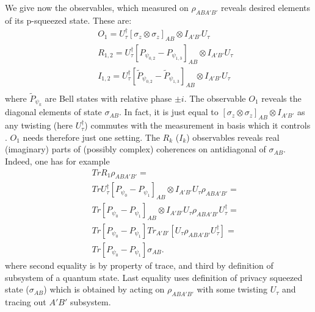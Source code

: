 \documentclass[twocolumn,prl,aps]{revtex4}
\def\ben{\begin{eqnarray}}
\def\een{\end{eqnarray}}
\def\ot{\otimes}
\begin{document}
We give now the observables, which measured on $\rho_{ABA'B'}$ reveals desired 
elements of its p-squeezed state. These are:
\ben
&&O_1 = U_\tau^{\dagger} [\sigma_z \ot \sigma_z]_{AB}\ot I_{A'B'} U_\tau \nonumber\\
&&R_{1,2} = U_\tau^{\dagger} [P_{\psi_{0,2}} - P_{\psi_{1,3}}]_{AB}\ot I_{A'B'} U_\tau \nonumber\\
&&I_{1,2}  = U_\tau^{\dagger} [\tilde{P}_{\psi_{0,2}} - \tilde{P}_{\psi_{1,3}}]_{AB}\ot I_{A'B'} U_\tau \nonumber\\
\een
where $\tilde{P}_{\psi_k}$ are Bell states with relative phase $\pm i$. The observable $O_1$ reveals 
the diagonal elements of state $\sigma_{AB}$. In fact, it is just equal to $[\sigma_z \ot \sigma_z]_{AB}\ot I_{A'B'}$
as any twisting (here $U_\tau^{\dagger}$) commutes with the measurement 
in basis which it controls \cite{keyhuge}. $O_1$ needs therefore
just one setting. The $R_k$ ($I_k$) observables reveals real (imaginary) parts 
of (possibly complex) coherences on antidiagonal of $\sigma_{AB}$. 
Indeed, one has for example
\ben
&&Tr R_1 \rho_{ABA'B'} = \nonumber \\
&&Tr U_\tau^{\dagger} [P_{\psi_0} - P_{\psi_1}]_{AB}\ot I_{A'B'} U_\tau \rho_{ABA'B'}=\nonumber \\
&&Tr  [P_{\psi_0} - P_{\psi_1}]_{AB}\ot I_{A'B'} U_\tau \rho_{ABA'B'}U_\tau^{\dagger}=\nonumber \\
&&Tr  [P_{\psi_0} - P_{\psi_1}] Tr_{A'B'}[U_\tau \rho_{ABA'B'}U_\tau^{\dagger}]=\nonumber \\
&&Tr [P_{\psi_0} - P_{\psi_1}] \sigma_{AB}.
\een
where second equality is by property of trace, and third by 
definition of subsystem of a quantum state. 
Last equality uses definition of privacy squeezed state ($\sigma_{AB}$) 
which is obtained 
by acting on $\rho_{ABA'B'}$ with some twisting $U_\tau$ 
and tracing out $A'B'$ subsystem.
\end{document}
